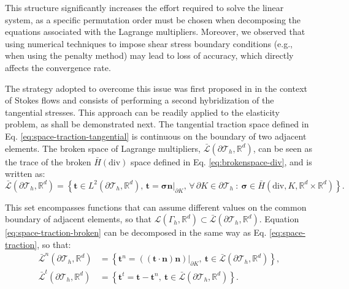 \documentclass[english,11pt,3p,number,sort&compress]{elsarticle}
\begin{document}
This structure significantly increases the effort required to solve the linear system, as a specific permutation order must be chosen when decomposing the equations associated with the Lagrange multipliers. Moreover, we observed that using numerical techniques to impose shear stress boundary conditions (e.g., when using the penalty method) may lead to loss of accuracy, which directly affects the convergence rate.

The strategy adopted to overcome this issue was first proposed in \cite{puga2025stable} in the context of Stokes flows and consists of performing a second hybridization of the tangential stresses. This approach can be readily applied to the elasticity problem, as shall be demonstrated next. The tangential traction space defined in Eq. \eqref{eq:space-traction-tangential} is continuous on the boundary of two adjacent elements. The broken space of Lagrange multipliers, $\bar{\mathcal{L}}(\partial\mathcal{T}_h,\mathbb{R}^d)$, can be seen as the trace of the broken $\bar{H}(\text{div})$ space defined in Eq. \eqref{eq:brokenspace-div}, and is written as:
\begin{equation}
	\label{eq:space-traction-broken}
	\bar{\mathcal{L}}(\partial\mathcal{T}_h,\mathbb{R}^d) = \left\{\bm{t} \in L^2(\partial\mathcal{T}_h,\mathbb{R}^d), \, \bm{t}=\bm{\sigma}\bm{n}\lvert_{\partial K}, \, \forall \, \partial K \in \partial\mathcal{T}_h ~:~\bm{\sigma} \in \bar{H}(\text{div},K,\mathbb{R}^d \times \mathbb{R}^d) \right\}.
\end{equation}

\noindent This set encompasses functions that can assume different values on the common boundary of adjacent elements, so that $\mathcal{L}(\Gamma_h,\mathbb{R}^d) \subset \bar{\mathcal{L}}(\partial\mathcal{T}_h,\mathbb{R}^d)$. Equation \eqref{eq:space-traction-broken} can be decomposed in the same way as Eq. \eqref{eq:space-traction}, so that:
\begin{subequations}
	\begin{align}
		\bar{\mathcal{L}}^n(\partial\mathcal{T}_h,\mathbb{R}^d) &= \left\{\bm{t}^n=((\bm{t}\cdot\bm{n})\bm{n})\lvert_{\partial K}, ~\bm{t} \in \bar{\mathcal{L}}(\partial\mathcal{T}_h,\mathbb{R}^d) \right\} , \label{eq:space-traction-broken-normal}\\
		\bar{\mathcal{L}}^t(\partial\mathcal{T}_h,\mathbb{R}^d) &= \left\{\bm{t}^t=\bm{t}-\bm{t}^n, ~\bm{t} \in \bar{\mathcal{L}}(\partial\mathcal{T}_h,\mathbb{R}^d) \right\} . \label{eq:space-traction-broken-tangential}
	\end{align}
\end{subequations}
\end{document}
